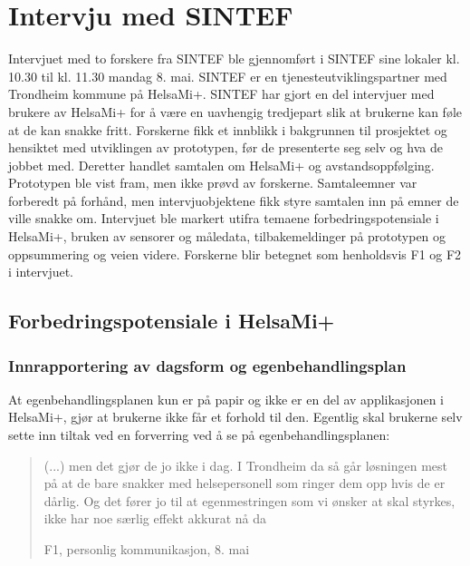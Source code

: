 
\section{Intervju med SINTEF}\label{intervju-med-sintef}
Intervjuet med to forskere fra SINTEF ble gjennomført i SINTEF sine lokaler
kl. 10.30 til kl. 11.30 mandag 8. mai. SINTEF er en tjenesteutviklingspartner med
Trondheim kommune på HelsaMi+. SINTEF har gjort en del intervjuer med brukere av
HelsaMi+ for å være en uavhengig tredjepart slik at brukerne kan føle at de kan snakke fritt.
Forskerne fikk et innblikk i bakgrunnen til prosjektet og hensiktet med utviklingen av prototypen,
før de presenterte seg selv og hva de jobbet med. Deretter handlet samtalen om
HelsaMi+ og avstandsoppfølging. Prototypen ble vist fram, men ikke prøvd av
forskerne. Samtaleemner var forberedt på forhånd, men intervjuobjektene fikk styre samtalen inn på emner
de ville snakke om. Intervjuet ble markert utifra temaene forbedringspotensiale i HelsaMi+, bruken av
sensorer og måledata, tilbakemeldinger på prototypen og oppsummering og veien videre.
Forskerne blir betegnet som henholdsvis F1 og F2 i intervjuet.

\subsection{Forbedringspotensiale i HelsaMi+}

\subsubsection{Innrapportering av dagsform og egenbehandlingsplan}
At egenbehandlingsplanen kun er på papir og ikke er en del av applikasjonen i HelsaMi+, gjør at brukerne ikke
får et forhold til den. Egentlig skal brukerne selv sette inn tiltak ved en forverring ved å se på
egenbehandlingsplanen:
\blockquote[F1, personlig kommunikasjon, 8. mai]{(...) men det gjør de jo ikke i dag. I Trondheim da så går løsningen mest
    på at de bare snakker med helsepersonell som ringer dem opp hvis de
er dårlig. Og det fører jo til at egenmestringen som vi ønsker at skal styrkes, ikke har noe særlig effekt akkurat nå da}

